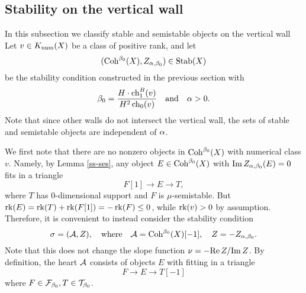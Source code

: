 \documentclass[letterpaper,11pt]{amsart}%
\theoremstyle{remark}
\begin{document}
\subsection{Stability on the vertical wall}\label{section:stabvertwall}
In this subsection we classify stable and semistable objects on the vertical wall %
Let $v \in K_{\mathrm{num}}(X)$ be a class of positive rank, and let 
\[ (\mathrm{Coh}^{\beta_0}(X), Z_{\alpha,\beta_0}) \in \operatorname{\mathrm{Stab}}(X) \] 
be the stability condition constructed in the previous section with 
\[ \beta_0 = \frac{H \cdot \operatorname{\mathrm{ch}}_1^B(v)}{H^2 \operatorname{\mathrm{ch}}_0(v)} \quad \mathrm{and} \quad \alpha > 0. \] Note that since other walls do not intersect the vertical wall, the sets of stable and semistable objects are independent of $\alpha$.

We first note that there are no nonzero objects in $\mathrm{Coh}^{\beta_0}(X)$ with numerical class $v$. Namely, by Lemma \ref{ss-ses}, any object $E \in \mathrm{Coh}^{\beta_0}(X)$ with $\mathrm{Im}\, Z_{\alpha,\beta_0}(E) = 0$ fits in a triangle
\[ F[1] \to E \to T, \]
where $T$ has 0-dimensional support and $F$ is $\mu$-semistable. But $\operatorname{\mathrm{rk}}(E) = \operatorname{\mathrm{rk}}(T) + \operatorname{\mathrm{rk}}(F[1]) = -\operatorname{\mathrm{rk}}(F) \le 0$, while $\operatorname{\mathrm{rk}}(v) > 0$ by assumption. Therefore, it is convenient to instead consider the stability condition 
\[ \sigma = (\mathcal{A}, Z), \quad \mathrm{where} \quad \mathcal{A} = \mathrm{Coh}^{\beta_0}(X)[-1], \quad Z = -Z_{\alpha,\beta_0}. \] 
Note that this does not change the slope function $\nu = -\mathrm{Re}\, Z/\mathrm{Im}\, Z$. By definition, the heart $\mathcal{A}$ consists of objects $E$ with fitting in a triangle
\[ F \to E \to T[-1] \]
where $F \in \mathcal{F}_{\beta_0}, T \in \mathcal{T}_{\beta_0}$.
\end{document}
